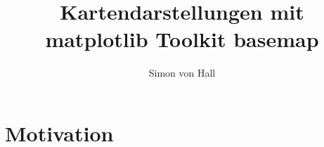 \documentclass[a4paper,10pt]{article}
\title{Kartendarstellungen mit\\matplotlib Toolkit basemap}
\author{Simon von Hall}
\date{}
\begin{document}
\maketitle
\clearpage
\tableofcontents
\section{Motivation}
\label{sec:1}





\end{document}
